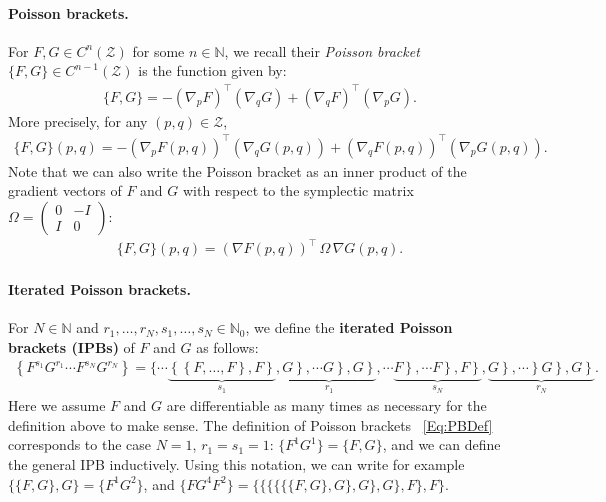 \documentclass[11pt]{article}
\newcommand{\Z}{\mathcal{Z}}
\newcommand{\N}{\mathbb{N}}
\begin{document}
\paragraph{Poisson brackets.}
For $F,G \in C^n(\Z)$ for some $n \in \N$, we recall their {\em Poisson bracket} $\{F,G\} \in C^{n-1}(\Z)$ is the function given by:
\begin{align}\label{Eq:PBDef}
    \{F,G\} = -(\nabla_{p}F)^\top (\nabla_{q} G) + (\nabla_{q}F)^\top (\nabla_{p}G).
\end{align}
More precisely, for any $(p,q) \in \Z$,
\begin{align*}
    \{F,G\}(p,q) = -(\nabla_{p}F (p,q))^\top (\nabla_{q} G(p,q)) + (\nabla_{q} F(p,q))^\top (\nabla_{p} G(p,q)).
\end{align*}
Note that we can also write the Poisson bracket as an inner product of the gradient vectors of $F$ and $G$ with respect to the symplectic matrix $\Omega = \begin{pmatrix}
    0 & -I \\ 
    I & 0
\end{pmatrix}$:
\begin{align*}
    \{F,G\}(p,q) = (\nabla F(p,q))^\top \, \Omega \, \nabla G(p,q).
\end{align*}

\paragraph{Iterated Poisson brackets.}
For $N \in \N$ and $r_{1},\dots,r_{N},s_{1},\dots,s_{N} \in \N_0$, we define the {\bf iterated Poisson brackets (IPBs)} of $F$ and $G$ as follows:
\begin{align*}
    \left\{F^{s_{1}}G^{r_{1}}\cdots F^{s_{N}}G^{r_{N}}\right\} =\{\cdots\underbrace{\left\{\left\{F,\dots,F\right\},F\right\}}_{s_{1}},\underbrace{\left.\left.\left.G\right\},\cdots G\right\},G\right\}}_{r_{1}},\cdots\underbrace{\left.\left.\left.F\right\},\cdots F\right\},F\right\}}_{s_{N}},\underbrace{\left.\left.\left.\left.G\right\},\cdots\right\}G\right\},G\right\}}_{r_{N}}.
\end{align*}
Here we assume $F$ and $G$ are differentiable as many times as necessary for the definition above to make sense.
The definition of Poisson brackets ~\eqref{Eq:PBDef} corresponds to the case $N=1$, $r_1 = s_1 = 1$: $\{F^1 G^1\} = \{F,G\}$, and we can define the general IPB inductively.
Using this notation, we can write for example $\{\{F, G\}, G\} = \{F^1 G^2\}$, and 
$\{FG^4F^2\} = \{\{\{\{\{\{F,G\}, G\}, G\}, G\}, F\}, F\}.$
\end{document}
